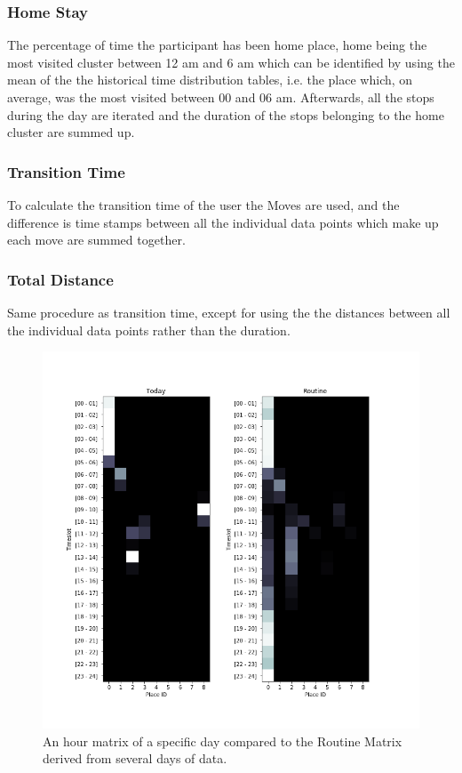 \subsubsection{Home Stay} 
The percentage of time the participant has been home place, home being the most visited cluster between 12 am and 6 am which can be identified by using the mean of the the historical time distribution tables, i.e. the place which, on average, was the most visited between 00 and 06 am. Afterwards, all the stops during the day are iterated and the duration of the stops belonging to the home cluster are summed up.

\subsubsection{Transition Time} 
To calculate the transition time of the user the Moves are used, and the difference is time stamps between all the individual data points which make up each move are summed together. 

\subsubsection{Total Distance} 
Same procedure as transition time, except for using the the distances between all the individual data points rather than the duration.


\begin{figure}
    \centering
    \includegraphics[width=\textwidth]{images/routine.png}
    \caption{An hour matrix of a specific day compared to the Routine Matrix derived from several days of data.}
    \label{fig:routine_example}
\end{figure}


